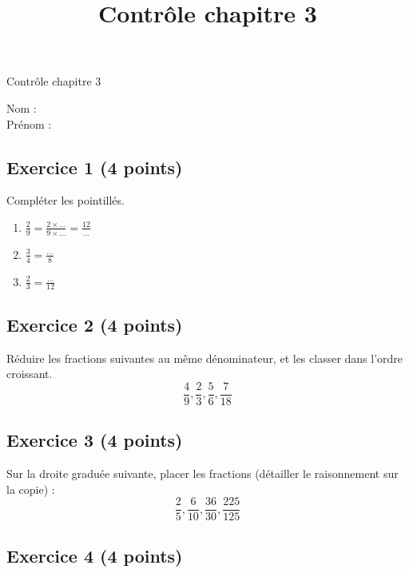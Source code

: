 \documentclass[14 pt]{extarticle}
\title{Contrôle chapitre 3}
\date{}
\theoremstyle{plain}
\begin{document}
\begin{center}{\Large Contrôle chapitre 3}\\ 
 \end{center}
 Nom : \\
 Prénom : 
 \subsection*{Exercice 1 (4 points)}
 
Compléter les pointillés.
\begin{enumerate}
\item $\frac29=\frac{2\times \ldots}{9\times \ldots} = \frac{12}\ldots$
\item $\frac34=\frac\ldots{8}$
\item $\frac23=\frac{\ldots}{12}$
\end{enumerate}

\subsection*{Exercice 2 (4 points)}
Réduire les fractions suivantes au même dénominateur, et les classer dans l'ordre croissant. 
\[ \frac49, \frac23, \frac56, \frac7{18}\]
\subsection*{Exercice 3 (4 points)}

Sur la droite graduée suivante, placer les fractions (détailler le raisonnement sur la copie) : 
\[ \frac25, \frac6{10}, \frac{36}{30}, \frac{225}{125}\]


\subsection*{Exercice 4 (4 points)}
\end{document}
